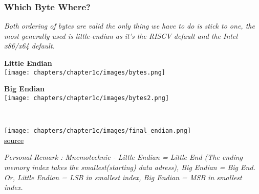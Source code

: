 \subsubsection{Which Byte Where?}
\textit{Both ordering of bytes are valid the only thing we have to do is stick to one, the most generally used is little-endian as it's the RISCV default and the Intel x86/x64 default.} \\ \vspace*{5px}
\begin{minipage}[htp]{0.45\textwidth}
    \begin{center}
        \textbf{Little Endian} \\ \vspace*{5px}
        \texttt{[image: chapters/chapter1c/images/bytes.png]}
    \end{center}
\end{minipage}
\hfill
\vline
\hfill
\begin{minipage}[htp]{0.45\textwidth}
    \begin{center}
        \textbf{Big Endian} \\ \vspace*{5px}
        \texttt{[image: chapters/chapter1c/images/bytes2.png]}
\end{center}
\end{minipage} \\ \vspace*{5px}
\begin{center}
    \texttt{[image: chapters/chapter1c/images/final\_endian.png]} \\
    \href{https://www.google.com/url?sa=i&url=https%3A%2F%2Fmedium.com%2Fmycsdegree%2Fsockets-in-c-little-and-big-endian-machines-23c9ed484c20&psig=AOvVaw1P8zdPW_G0ioJC2Ka6cOX5&ust=1731236021875000&source=images&cd=vfe&opi=89978449&ved=0CBQQjRxqFwoTCPinlvaKz4kDFQAAAAAdAAAAABAJ}{source}
\end{center}
\textit{Personal Remark : Mnemotechnic - Little Endian = Little End (The ending memory index takes the smallest(starting) data adress), Big Endian = Big End.}
\textit{Or, Little Endian = LSB in smallest index, Big Endian = MSB in smallest index.}